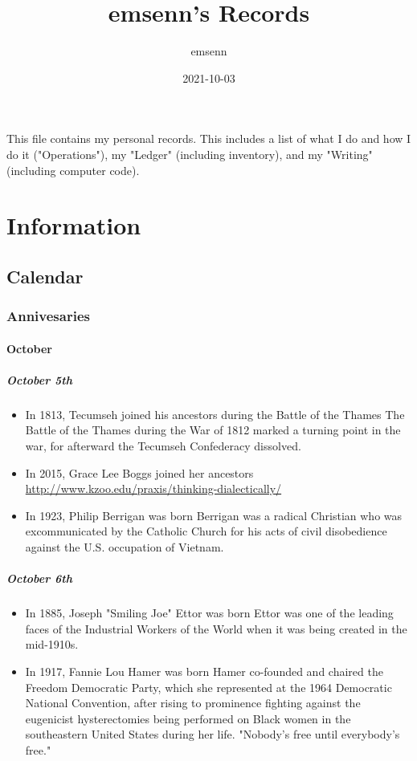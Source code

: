 \documentclass[11pt]{article}
\author{emsenn}
\date{2021-10-03}
\title{emsenn's Records}
\begin{document}
\maketitle
This file contains my personal records. This includes a list of what I do and how I do it ("Operations"), my "Ledger" (including inventory), and my "Writing" (including computer code).
\setcounter{tocdepth}{10}
\tableofcontents
\section*{Information}
\label{sec:orgf1cf6d5}
\subsection*{Calendar}
\label{sec:org4cfadb9}
\subsubsection*{Annivesaries}
\label{sec:orge16d5ac}
\paragraph*{October}
\label{sec:org8d70bc1}
\subparagraph*{October 5th}
\label{sec:org2fbda83}
\begin{itemize}
\item In 1813, Tecumseh joined his ancestors during the Battle of the Thames
\label{sec:org0956919}
The Battle of the Thames during the War of 1812 marked a turning point in the war, for afterward the Tecumseh Confederacy dissolved.
\item In 2015, Grace Lee Boggs joined her ancestors
\label{sec:orgc87eed3}
\url{http://www.kzoo.edu/praxis/thinking-dialectically/}
\item In 1923, Philip Berrigan was born
\label{sec:orgf62f7b6}
Berrigan was a radical Christian who was excommunicated by the Catholic Church for his acts of civil disobedience against the U.S. occupation of Vietnam.
\end{itemize}
\subparagraph*{October 6th}
\label{sec:orgb833cea}
\begin{itemize}
\item In 1885, Joseph "Smiling Joe" Ettor was born
\label{sec:org76052c5}
Ettor was one of the leading faces of the Industrial Workers of the World when it was being created in the mid-1910s.
\item In 1917, Fannie Lou Hamer was born
\label{sec:org9e549da}
Hamer co-founded and chaired the Freedom Democratic Party, which she represented at the 1964 Democratic National Convention, after rising to prominence fighting against the eugenicist hysterectomies being performed on Black women in the southeastern United States during her life. "Nobody's free until everybody's free."
\end{itemize}
\end{document}
